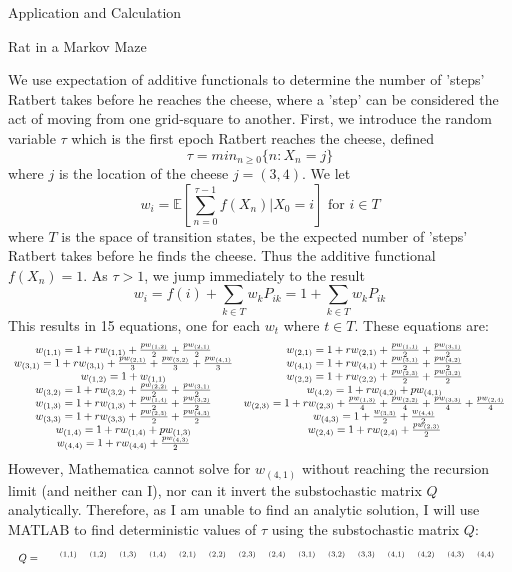 \documentclass[12pt]{article}
\newcommand{\matindex}[1]{\mbox{\scriptsize#1}}
\newcommand\scalemath[2]{\scalebox{#1}{\mbox{\ensuremath{\displaystyle #2}}}}
\numberwithin{equation}{section}
\begin{document}
\begin{section}{Application and Calculation}
\begin{subsection}{Rat in a Markov Maze}
\begin{enumerate}
        We use expectation of additive functionals to determine the number of 'steps' Ratbert takes before he reaches the cheese, where a 'step' can be considered the act of moving from one grid-square to another. First, we introduce the random variable $\tau$ which is the first epoch Ratbert reaches the cheese, defined
        $$\tau=min_{n\geq 0}\{n:X_n=j\}$$
        where $j$ is the location of the cheese $j=(3,4)$. We let
        $$w_i=\mathbb{E}[\sum_{n=0}^{\tau-1} f(X_n)|X_0=i]\text{ for }i\in T$$
        where $T$ is the space of transition states, be the expected number of 'steps' Ratbert takes before he finds the cheese. Thus the additive functional $f(X_n)=1$. As $\tau>1$, we jump immediately to the result
        $$w_i=f(i)+\sum_{k\in T}w_k P_{ik}=1+\sum_{k\in T}w_k P_{ik}$$
        This results in 15 equations, one for each $w_t$ where $t\in T$. These equations are:
        \[\scalemath{0.8}{\begin{array}{cc}w_{(1,1)}=1+rw_{(1,1)}+\frac{pw_{(1,2)}}{2}+\frac{pw_{(2,1)}}{2}&w_{(2,1)}=1+rw_{(2,1)}+\frac{pw_{(1,1)}}{2}+\frac{pw_{(3,1)}}{2}\\
        w_{(3,1)}=1+rw_{(3,1)}+\frac{pw_{(2,1)}}{3}+\frac{pw_{(3,2)}}{3}+\frac{pw_{(4,1)}}{3}&   w_{(4,1)}=1+rw_{(4,1)}+\frac{pw_{(3,1)}}{2}+\frac{pw_{(4,2)}}{2}\\w_{(1,2)}=1+w_{(1,1)}&w_{(2,2)}=1+rw_{(2,2)}+\frac{pw_{(2,3)}}{2}+\frac{pw_{(3,2)}}{2}\\
        w_{(3,2)}=1+rw_{(3,2)}+\frac{pw_{(2,2)}}{2}+\frac{pw_{(3,1)}}{2}&w_{(4,2)}=1+rw_{(4,2)}+pw_{(4,1)}\\w_{(1,3)}=1+rw_{(1,3)}+\frac{pw_{(1,4)}}{2}+\frac{pw_{(3,2)}}{2}&
        w_{(2,3)}=1+rw_{(2,3)}+\frac{pw_{(1,3)}}{4}+\frac{pw_{(2,2)}}{4}+\frac{pw_{(3,3)}}{4}+\frac{pw_{(2,4)}}{4}\\w_{(3,3)}=1+rw_{(3,3)}+\frac{pw_{(2,3)}}{2}+\frac{pw_{(4,3)}}{2}&w_{(4,3)}=1+\frac{w_{(3,3)}}{2}+\frac{w_{(4,4)}}{2}\\
        w_{(1,4)}=1+rw_{(1,4)}+pw_{(1,3)}&w_{(2,4)}=1+rw_{(2,4)}+\frac{pw_{(2,3)}}{2}\\w_{(4,4)}=1+rw_{(4,4)}+\frac{pw_{(4,3)}}{2}\end{array}}\]
        However, Mathematica cannot solve for $w_{(4,1)}$ without reaching the recursion limit (and neither can I), nor can it invert the substochastic matrix $Q$ analytically. Therefore, as I am unable to find an analytic solution, I will use MATLAB to find deterministic values of $\tau$ using the substochastic matrix $Q$:
        \[\scalemath{0.75}{Q=\begin{blockarray}{cccccccccccccccc}&\matindex{(1,1)}&\matindex{(1,2)}&\matindex{(1,3)}&\matindex{(1,4)}&\matindex{(2,1)}&\matindex{(2,2)}&\matindex{(2,3)}&\matindex{(2,4)}&\matindex{(3,1)}&\matindex{(3,2)}&\matindex{(3,3)}&\matindex{(4,1)}&\matindex{(4,2)}&\matindex{(4,3)}&\matindex{(4,4)}\\

\end{blockarray}}\]
\end{enumerate}
\end{subsection}
\end{section}
\end{document}
